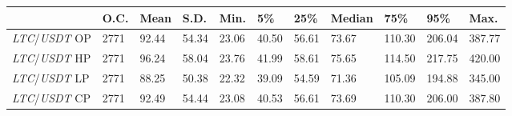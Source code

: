 \begin{tabular}{lllllllllll}
\toprule
 & \textbf{O.C.} & \textbf{Mean} & \textbf{S.D.} & \textbf{Min.} & \textbf{5\%} & \textbf{25\%} & \textbf{Median} & \textbf{75\%} & \textbf{95\%} & \textbf{Max.} \\
\midrule
\emph{LTC}/\emph{USDT} OP & 2771 & 92.44 & 54.34 & 23.06 & 40.50 & 56.61 & 73.67 & 110.30 & 206.04 & 387.77 \\
\emph{LTC}/\emph{USDT} HP & 2771 & 96.24 & 58.04 & 23.76 & 41.99 & 58.61 & 75.65 & 114.50 & 217.75 & 420.00 \\
\emph{LTC}/\emph{USDT} LP & 2771 & 88.25 & 50.38 & 22.32 & 39.09 & 54.59 & 71.36 & 105.09 & 194.88 & 345.00 \\
\emph{LTC}/\emph{USDT} CP & 2771 & 92.49 & 54.44 & 23.08 & 40.53 & 56.61 & 73.69 & 110.30 & 206.00 & 387.80 \\
\bottomrule
\end{tabular}
